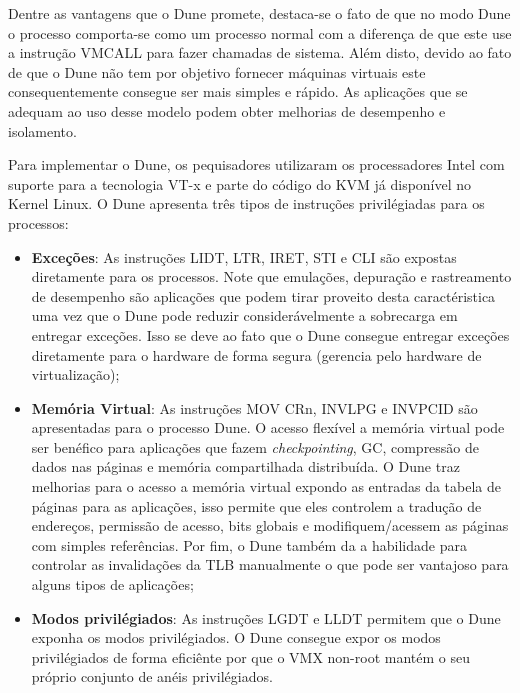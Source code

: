 Dentre as vantagens que o Dune promete, destaca-se o fato de que no modo Dune o
processo comporta-se como um processo normal com a diferença de que este use a
instrução VMCALL para fazer chamadas de sistema. Além disto, devido ao fato de
que o Dune não tem por objetivo fornecer máquinas virtuais este
consequentemente consegue ser mais simples e rápido. As aplicações que se
adequam ao uso desse modelo podem obter melhorias de desempenho e isolamento.

Para implementar o Dune, os pequisadores utilizaram os processadores Intel com
suporte para a tecnologia VT-x e parte do código do KVM já disponível no Kernel
Linux. O Dune apresenta três tipos de instruções privilégiadas para os
processos:

\begin{itemize}
  \item \textbf{Exceções}:  As instruções LIDT, LTR, IRET, STI e CLI são
        expostas diretamente para os processos. Note que emulações, depuração e
        rastreamento de desempenho são aplicações que podem tirar proveito
        desta caractéristica uma vez que o Dune pode reduzir considerávelmente
        a sobrecarga em entregar exceções. Isso se deve ao fato que o Dune
        consegue entregar exceções diretamente para o hardware de forma segura
        (gerencia pelo hardware de virtualização);
  \item \textbf{Memória Virtual}: As instruções MOV CRn, INVLPG e INVPCID são
        apresentadas para o processo Dune. O acesso flexível a memória virtual
        pode ser benéfico para aplicações que fazem \emph{checkpointing}, GC,
        compressão de dados nas páginas e memória compartilhada distribuída. O
        Dune traz melhorias para o acesso a memória virtual expondo as entradas
        da tabela de páginas para as aplicações, isso permite que eles
        controlem a tradução de endereços, permissão de acesso, bits globais e
        modifiquem/acessem as páginas com simples referências. Por fim, o Dune
        também da a habilidade para controlar as invalidações da TLB
        manualmente o que pode ser vantajoso para alguns tipos de aplicações;
  \item \textbf{Modos privilégiados}: As instruções LGDT e LLDT permitem que o
        Dune exponha os modos privilégiados. O Dune consegue expor os modos
        privilégiados de forma eficiênte por que o VMX non-root mantém o seu
        próprio conjunto de anéis privilégiados.
\end{itemize}


